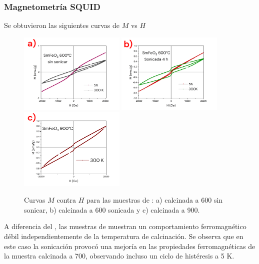 \documentclass[../main.tex]{subfiles}
\begin{document}
\subsubsection{Magnetometría SQUID}
Se obtuvieron las siguientes curvas de $M$ vs $H$
\begin{figure}[H]
    \centering
    \includegraphics[width=0.45\textwidth]{fig/mvhSm.png}
    \quad
    \includegraphics[width=0.45\textwidth]{fig/mvhSm-S.png}
    \includegraphics[width=0.45\textwidth]{fig/mvhSm900.png}
    \caption{Curvas $M$ contra $H$ para las muestras de \sama{}: a) calcinada a 600\gradoC{} sin sonicar, b) calcinada a 600\gradoC{} sonicada y c) calcinada a 900\gradoC{}.}
    \label{fig:mvhSm}
\end{figure}
A diferencia del \neod{}, las muestras de \sama{} muestran un comportamiento ferromagnético débil independientemente de la temperatura de calcinación. Se observa que en este caso la sonicación provocó una mejoría en las propiedades ferromagnéticas de la muestra calcinada a 700\gradoC{}, observando incluso un ciclo de histéresis a 5 K.
\end{document}
